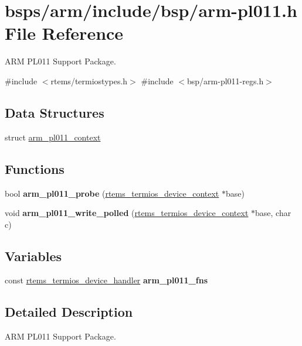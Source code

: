 \hypertarget{arm-pl011_8h}{}\section{bsps/arm/include/bsp/arm-\/pl011.h File Reference}
\label{arm-pl011_8h}


A\+RM P\+L011 Support Package.  


{\ttfamily \#include $<$rtems/termiostypes.\+h$>$}\newline
{\ttfamily \#include $<$bsp/arm-\/pl011-\/regs.\+h$>$}\newline
\subsection*{Data Structures}
\begin{DoxyCompactItemize}
\item 
struct \mbox{\hyperlink{structarm__pl011__context}{arm\+\_\+pl011\+\_\+context}}
\end{DoxyCompactItemize}
\subsection*{Functions}
\begin{DoxyCompactItemize}
\item 
\mbox{\label{arm-pl011_8h_a4f7c7a6b020dd7d6d03d38027b77ba86}} 
bool {\bfseries arm\+\_\+pl011\+\_\+probe} (\mbox{\hyperlink{structrtems__termios__device__context}{rtems\+\_\+termios\+\_\+device\+\_\+context}} $\ast$base)
\item 
\mbox{\label{arm-pl011_8h_af0291297ad66939c38b9569c89e08aa3}} 
void {\bfseries arm\+\_\+pl011\+\_\+write\+\_\+polled} (\mbox{\hyperlink{structrtems__termios__device__context}{rtems\+\_\+termios\+\_\+device\+\_\+context}} $\ast$base, char c)
\end{DoxyCompactItemize}
\subsection*{Variables}
\begin{DoxyCompactItemize}
\item 
\mbox{\label{arm-pl011_8h_a18c461201c6c35f502bfd445464497de}} 
const \mbox{\hyperlink{structrtems__termios__device__handler}{rtems\+\_\+termios\+\_\+device\+\_\+handler}} {\bfseries arm\+\_\+pl011\+\_\+fns}
\end{DoxyCompactItemize}


\subsection{Detailed Description}
A\+RM P\+L011 Support Package. 

